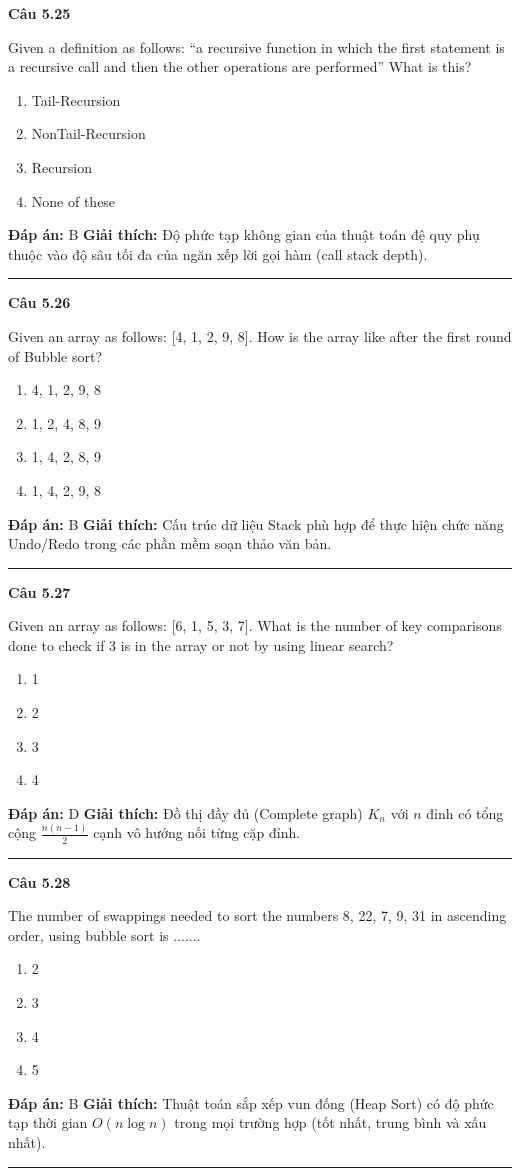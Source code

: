 \documentclass[11pt,a4paper]{article}
\newenvironment{question}[1]{%
  \par\vspace{1em}\noindent\textbf{\large Câu #1}\par\vspace{0.4em}
}{%
  \par\vspace{1em}\hrule\vspace{0.6em}
}
\newenvironment{choices}{%
  \begin{enumerate}[label=\textbf{\Alph*.},leftmargin=2.2em,itemsep=2pt,topsep=3pt]
}{%
  \end{enumerate}
}
\newcommand{\choice}{\item}
\begin{document}
\begin{question}{5.25}
Given a definition as follows: ``a recursive function in which the first statement is a recursive call and then the other operations are performed'' What is this?
\begin{choices}
\choice Tail-Recursion
\choice NonTail-Recursion
\choice Recursion
\choice None of these
\end{choices}
\textbf{Đáp án:} B
\textbf{Giải thích:} Độ phức tạp không gian của thuật toán đệ quy phụ thuộc vào độ sâu tối đa của ngăn xếp lời gọi hàm (call stack depth).
\end{question}

\begin{question}{5.26}
Given an array as follows: [4, 1, 2, 9, 8]. How is the array like after the first round of Bubble sort?
\begin{choices}
\choice 4, 1, 2, 9, 8
\choice 1, 2, 4, 8, 9
\choice 1, 4, 2, 8, 9
\choice 1, 4, 2, 9, 8
\end{choices}
\textbf{Đáp án:} B
\textbf{Giải thích:} Cấu trúc dữ liệu Stack phù hợp để thực hiện chức năng Undo/Redo trong các phần mềm soạn thảo văn bản.
\end{question}

\begin{question}{5.27}
Given an array as follows: [6, 1, 5, 3, 7]. What is the number of key comparisons done to check if 3 is in the array or not by using linear search?
\begin{choices}
\choice 1
\choice 2
\choice 3
\choice 4
\end{choices}
\textbf{Đáp án:} D
\textbf{Giải thích:} Đồ thị đầy đủ (Complete graph) $K_n$ với $n$ đỉnh có tổng cộng $\frac{n(n-1)}{2}$ cạnh vô hướng nối từng cặp đỉnh.
\end{question}

\begin{question}{5.28}
The number of swappings needed to sort the numbers 8, 22, 7, 9, 31 in ascending order, using bubble sort is .......
\begin{choices}
\choice 2
\choice 3
\choice 4
\choice 5
\end{choices}
\textbf{Đáp án:} B
\textbf{Giải thích:} Thuật toán sắp xếp vun đống (Heap Sort) có độ phức tạp thời gian $O(n \log n)$ trong mọi trường hợp (tốt nhất, trung bình và xấu nhất).
\end{question}
\end{document}
